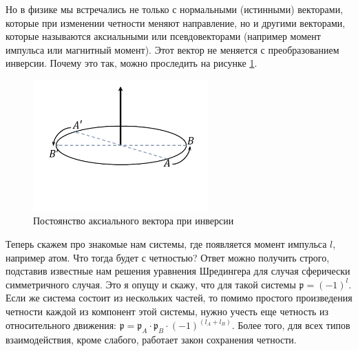 \documentclass[12pt]{article}
\begin{document}
Но в физике мы встречались не только с нормальными (истинными) векторами, которые при изменении четности меняют направление, но и другими векторами, которые называются аксиальными или псевдовекторами (например момент импульса или магнитный момент). Этот вектор не меняется с преобразованием инверсии. Почему это так, можно проследить на рисунке \ref{fig:sem_08_pic_1}.
\begin{figure}[h]
    \centering
    \includegraphics[width=0.6\textwidth,height=\textheight,keepaspectratio]{Seminar_08/pics/pic_01.pdf}
    \caption{Постоянство аксиального вектора при инверсии}
    \label{fig:sem_08_pic_1}
\end{figure}

Теперь скажем про знакомые нам системы, где появляется момент импульса $l$, например атом. Что тогда будет с четностью? Ответ можно получить строго, подставив известные нам решения уравнения Шредингера для случая сферически симметричного случая. Это я опущу и скажу, что для такой системы $\mathfrak{p} = (-1)^l$. Если же система состоит из нескольких частей, то помимо простого произведения четности каждой из компонент этой системы, нужно учесть еще четность из относительного движения: $\mathfrak{p} = \mathfrak{p}_A\cdot\mathfrak{p}_B\cdot (-1)^{(l_A+l_B)}$. Более того, для всех типов взаимодействия, кроме слабого, работает закон сохранения четности. 
\end{document}
